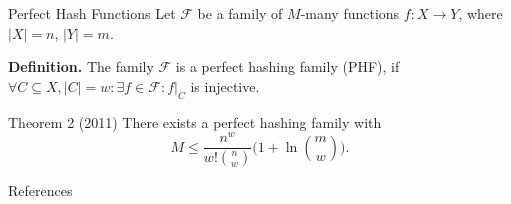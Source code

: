 \documentclass[10pt]{beamer}
\newcommand\restr[2]{\ensuremath{\left.#1\right|_{#2}}}
\begin{document}
\begin{frame}[fragile]{Perfect Hash Functions}
    Let $ \mathcal{F} $ be a family of $ M $-many functions $ f : X \to Y $, where
    $ |X| = n $, $ |Y| = m $.
    
    \textbf{Definition.} The family $ \mathcal{F} $ is a perfect hashing family (PHF), if
    $ \forall C \subseteq X, |C| = w: \exists f \in \mathcal{F}: \restr{f}{C} $ is injective.

    \vfill

    \begin{block}{Theorem 2 (2011)}
        There exists a perfect hashing family with
        \[
            M \leq \frac{n^w}{w!{n \choose w}}\bigg(1 + \ln{m \choose w}\bigg).
        \]
    \end{block}
\end{frame}



\begin{frame}[allowframebreaks]{References}
    \nocite{*}
    
    
\end{frame}
\end{document}
